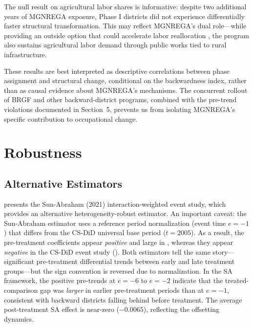 \documentclass[12pt]{article}
\begin{document}
The null result on agricultural labor shares is informative: despite two additional years of MGNREGA exposure, Phase I districts did not experience differentially faster structural transformation. This may reflect MGNREGA's dual role---while providing an outside option that could accelerate labor reallocation \citep{imbert2015labor}, the program also sustains agricultural labor demand through public works tied to rural infrastructure.

These results are best interpreted as descriptive correlations between phase assignment and structural change, conditional on the backwardness index, rather than as causal evidence about MGNREGA's mechanisms. The concurrent rollout of BRGF and other backward-district programs, combined with the pre-trend violations documented in Section~5, prevents us from isolating MGNREGA's specific contribution to occupational change.


\section{Robustness}

\subsection{Alternative Estimators}

 presents the Sun-Abraham (2021) interaction-weighted event study, which provides an alternative heterogeneity-robust estimator. An important caveat: the Sun-Abraham estimator uses a reference period normalization (event time $e = -1$) that differs from the CS-DiD universal base period ($t = 2005$). As a result, the pre-treatment coefficients appear \emph{positive} and large in , whereas they appear \emph{negative} in the CS-DiD event study (). Both estimators tell the same story---significant pre-treatment differential trends between early and late treatment groups---but the sign convention is reversed due to normalization. In the SA framework, the positive pre-trends at $e = -6$ to $e = -2$ indicate that the treated-comparison gap was \emph{larger} in earlier pre-treatment periods than at $e = -1$, consistent with backward districts falling behind before treatment. The average post-treatment SA effect is near-zero ($-0.0065$), reflecting the offsetting dynamics.
\end{document}
